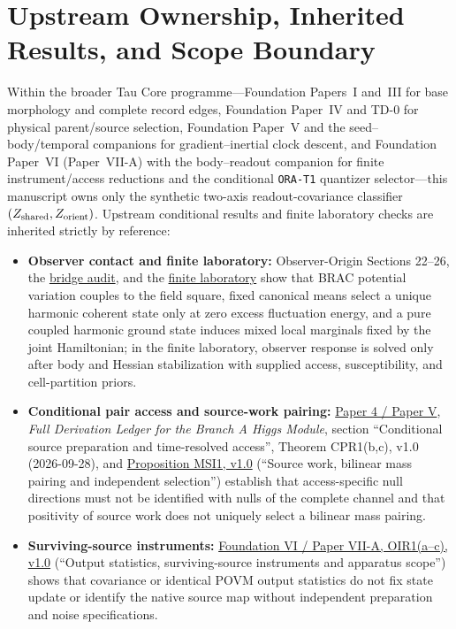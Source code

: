 \documentclass[12pt]{article}
\begin{document}
\section{Upstream Ownership, Inherited Results, and Scope Boundary}
\label{sec:upstream-ownership}

Within the broader Tau Core programme---Foundation Papers~I and~III for base
morphology and complete record edges, Foundation Paper~IV and TD-0 for physical
parent/source selection, Foundation Paper~V and the seed--body/temporal
companions for gradient--inertial clock descent, and Foundation Paper~VI
(Paper~VII-A) with the body--readout companion for finite instrument/access
reductions and the conditional \texttt{ORA-T1} quantizer selector---this
manuscript owns only the synthetic two-axis readout-covariance classifier
\((Z_{\rm shared},Z_{\rm orient})\). Upstream conditional results and finite
laboratory checks are inherited strictly by reference:
\begin{itemize}[leftmargin=1.4em]
\item \textbf{Observer contact and finite laboratory:} Observer-Origin
Sections 22--26, the
\href{https://github.com/tau-core-research/tau-core-theory/blob/main/docs/tau_rqm_instrument_to_record_bridge_001.md}{bridge audit},
and the
\href{https://github.com/tau-core-research/tau-core-theory/tree/main/experiments/seed_evolution_lab}{finite laboratory}
show that BRAC potential variation couples to the field square, fixed canonical means
select a unique harmonic coherent state only at zero excess fluctuation energy,
and a pure coupled harmonic ground state induces mixed local marginals fixed by
the joint Hamiltonian; in the finite laboratory, observer response is solved
only after body and Hessian stabilization with supplied access, susceptibility,
and cell-partition priors.
\item \textbf{Conditional pair access and source-work pairing:}
\href{https://github.com/tau-core-research/tau-core-higgs-module-paper4/blob/main/paper4_full_derivation/full_derivation.pdf#nameddest=cpr1}{Paper 4 / Paper V},
\emph{Full Derivation Ledger for the Branch A Higgs Module}, section
``Conditional source preparation and time-resolved access'', Theorem CPR1(b,c),
v1.0 (2026-09-28), and
\href{https://github.com/tau-core-research/tau-core-higgs-module-paper4/blob/main/paper4_full_derivation/full_derivation.pdf#nameddest=msi1}{Proposition MSI1, v1.0}
(``Source work, bilinear mass pairing and independent selection'') establish
that access-specific null directions must not be identified with nulls of the
complete channel and that positivity of source work does not uniquely select a
bilinear mass pairing.
\item \textbf{Surviving-source instruments:}
\href{https://github.com/tau-core-research/tau-core-quantum-readout-foundation-paper-vi/blob/main/paperVI_submission_source/main.pdf#nameddest=oir1}{Foundation VI / Paper VII-A, OIR1(a--c), v1.0}
(``Output statistics, surviving-source instruments and apparatus scope'') shows
that covariance or identical POVM output statistics do not fix state update or
identify the native source map without independent preparation and noise
specifications.
\end{itemize}
\end{document}
